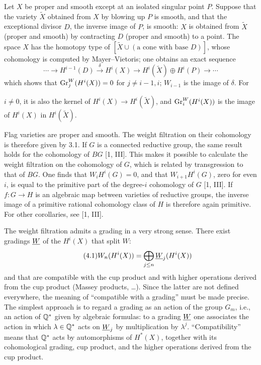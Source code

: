 \documentclass[8pt]{extarticle}
\begin{document}
 Let \(X\) be proper and smooth except at an isolated singular point \(P\). Suppose that the variety \(\widetilde X\) obtained from \(X\) by blowing up \(P\) is smooth, and that the exceptional divisor \(D\), the inverse image of \(P\), is smooth: \(X\) is obtained from \(\widetilde X\) (proper and smooth) by contracting \(D\) (proper and smooth) to a point. The space \(X\) has the homotopy type of \([\widetilde X\cup(\text{a cone with base }D)]\), whose cohomology is computed by Mayer--Vietoris; one obtains an exact sequence
\[
\cdots\to H^{i-1}(D)\xrightarrow{\delta}H^i(X)\to H^i(\widetilde X)\oplus H^i(P)\to\cdots
\]
which shows that \(\operatorname{Gr}_j^W(H^i(X))=0\) for \(j\ne i-1,i\); \(W_{i-1}\) is the image of \(\delta\). For
\EndSourcePage

\ReaderFont
\(i\ne0\), it is also the kernel of \(H^i(X)\to H^i(\widetilde X)\), and \(\operatorname{Gr}_i^W(H^i(X))\) is the image of \(H^i(X)\) in \(H^i(\widetilde X)\).

 Flag varieties are proper and smooth. The weight filtration on their cohomology is therefore given by 3.1. If \(G\) is a connected reductive group, the same result holds for the cohomology of \(BG\) [1, III]. This makes it possible to calculate the weight filtration on the cohomology of \(G\), which is related by transgression to that of \(BG\). One finds that \(W_iH^i(G)=0\), and that \(W_{i+1}H^i(G)\), zero for even \(i\), is equal to the primitive part of the degree-\(i\) cohomology of \(G\) [1, III]. If \(f:G\to H\) is an algebraic map between varieties of reductive groups, the inverse image of a primitive rational cohomology class of \(H\) is therefore again primitive. For other corollaries, see [1, III].

 The weight filtration admits a grading in a very strong sense. There exist gradings \(\underline{W}\) of the \(H^i(X)\) that split \(W\):
\begin{equation}\tag{4.1}
W_n(H^i(X))=\bigoplus_{j\le n}\underline{W}_j(H^i(X))
\end{equation}
and that are compatible with the cup product and with higher operations derived from the cup product (Massey products, \ldots). Since the latter are not defined everywhere, the meaning of “compatible with a grading” must be made precise. The simplest approach is to regard a grading as an action of the group \(G_m\), i.e., an action of \(\mathbb{Q}^*\) given by algebraic formulas: to a grading \(\underline{W}\) one associates the action in which \(\lambda\in\mathbb{Q}^*\) acts on \(\underline{W}_j\) by multiplication by \(\lambda^j\). “Compatibility” means that \(\mathbb{Q}^*\) acts by automorphisms of \(H^*(X)\), together with its cohomological grading, cup product, and the higher operations derived from the cup product.
\end{document}
